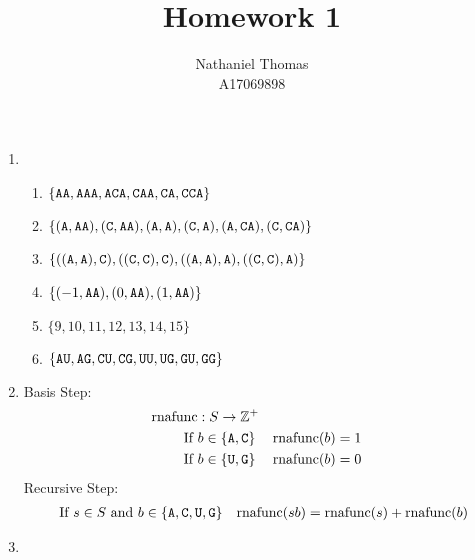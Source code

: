 \documentclass{article}
\title{Homework 1}
\author{Nathaniel Thomas \\ A17069898}
\begin{document}
\maketitle

\begin{enumerate}
	\item
	      \begin{enumerate}
		      \item $\{ \A\A, \A\A\A, \A\C\A, \C\A\A, \C\A, \C\C\A \}$
		      \item $\{ (\A, \A\A), (\C, \A\A), (\A, \A), (\C, \A), (\A, \C\A), (\C, \C\A)\}$
		      \item $\{ ((\A, \A), \C), ((\C, \C), \C), ((\A, \A), \A), ((\C, \C), \A) \}$
		      \item $\{ (-1, \A\A), (0, \A\A), (1, \A\A) \}$
		      \item $\{9, 10, 11, 12, 13, 14, 15\}$
		      \item $ \{ \A\U, \A\G, \C\U, \C\G, \U\U, \U\G, \G\U, \G\G \} $
	      \end{enumerate}
	\item
	      Basis Step:
	      \begin{align*}
		      \text{rnafunc} & :  S \to \mathbb{Z}^+                           \\
		      \text{If }     & b \in \{\A, \C\}      & \text{rnafunc}(b) & = 1 \\
		      \text{If }     & b \in \{\U, \G\}      & \text{rnafunc}(b) & = 0 \\
	      \end{align*}
	      Recursive Step:
	      \begin{align*}
		       & \text{If } s \in S \text{ and } b \in \{\A, \C, \U, \G\} & \text{rnafunc}(sb) = \text{rnafunc}(s) + \text{rnafunc}(b)
	      \end{align*}
	\item

\end{enumerate}
\end{document}
